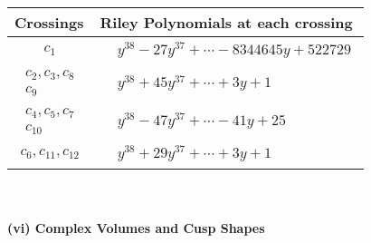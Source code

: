 \documentclass[1p]{elsarticle_modified}
\theoremstyle{definition}
\begin{document}
\begin{tabular}{m{50pt}|m{274pt}}
Crossings & \hspace{64pt}Riley Polynomials at each crossing \\
\hline $$\begin{aligned}c_{1}\end{aligned}$$&$\begin{aligned}
&y^{38}-27 y^{37}+\cdots-8344645 y+522729
\end{aligned}$\\
\hline $$\begin{aligned}c_{2},c_{3},c_{8}\\c_{9}\end{aligned}$$&$\begin{aligned}
&y^{38}+45 y^{37}+\cdots+3 y+1
\end{aligned}$\\
\hline $$\begin{aligned}c_{4},c_{5},c_{7}\\c_{10}\end{aligned}$$&$\begin{aligned}
&y^{38}-47 y^{37}+\cdots-41 y+25
\end{aligned}$\\
\hline $$\begin{aligned}c_{6},c_{11},c_{12}\end{aligned}$$&$\begin{aligned}
&y^{38}+29 y^{37}+\cdots+3 y+1
\end{aligned}$\\
\hline
\end{tabular}\\~\\
\newpage\flushleft \textbf{(vi) Complex Volumes and Cusp Shapes}
\end{document}
